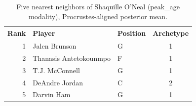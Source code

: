\begin{table}[htbp]
  \centering\small
  \begin{tabular}{rllc}
    \toprule
    Rank & Player & Position & Archetype \\
    \midrule
    1 & Jalen Brunson & G & 1 \\
    2 & Thanasis Antetokounmpo & F & 1 \\
    3 & T.J. McConnell & G & 1 \\
    4 & DeAndre Jordan & C & 2 \\
    5 & Darvin Ham & G & 1 \\
    \bottomrule
  \end{tabular}
  \caption{Five nearest neighbors of Shaquille O'Neal (peak_age modality), Procrustes-aligned posterior mean.}
  \label{tab:Shaquille_O_Neal_neighbors_peak_age}
\end{table}

